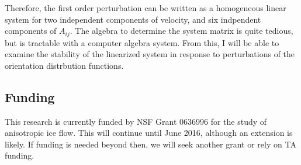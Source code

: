 \documentclass{report}
\begin{document}
Therefore, the first order perturbation can be written as a homogeneous linear system for two independent components of velocity, and six indpendent components of $A_{ij}$. The algebra to determine the system matrix is quite tedious, but is tractable with a computer algebra system. From this, I will be able to examine the stability of the linearized system in response to perturbations of the orientation distrbution functions.


\subsection{Funding}
This research is currently funded by NSF Grant 0636996 for the study of anisotropic ice flow. This will continue until June 2016, although an extension is likely. If funding is needed beyond then, we will seek another grant or rely on TA funding. 



\end{document}
